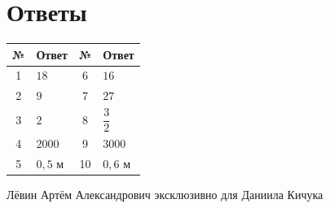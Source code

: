 \documentclass[a4paper,12pt]{article}
\begin{document}
\section*{Ответы}
\renewcommand{\arraystretch}{1.35}
\begin{center}
\begin{tabularx}{0.78\linewidth}{@{}cXcX@{}}
\toprule
\textbf{№} & \textbf{Ответ} & \textbf{№} & \textbf{Ответ}\\
\midrule
1 & $18$ & 6 & $16$\\
2 & $9$ & 7 & $27$\\
3 & $2$ & 8 & $\dfrac32$\\
4 & $2000$ & 9 & $3000$\\
5 & $0{,}5$ м & 10 & $0{,}6$ м\\
\bottomrule
\end{tabularx}
\end{center}

\vfill
\begin{center}
\small\textcolor{textgray}{Лёвин Артём Александрович эксклюзивно для Даниила Кичука}
\end{center}
\end{document}
